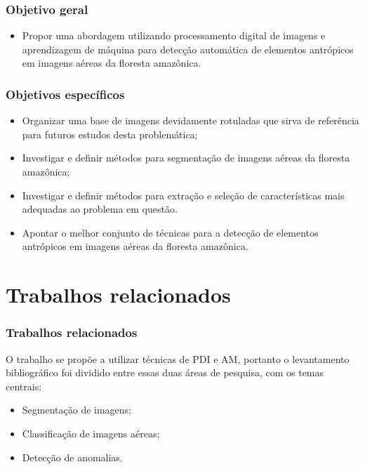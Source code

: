 \documentclass[t]{beamer}
\begin{document}
\begin{frame}[c]
\frametitle{Objetivo geral}

\begin{itemize}
	\item Propor uma abordagem utilizando processamento digital de imagens e aprendizagem de máquina para detecção automática de elementos antrópicos em imagens aéreas da floresta amazônica.
\end{itemize}
\end{frame}

\begin{frame}[c]
\frametitle{Objetivos específicos}

\begin{itemize}
    \item Organizar uma base de imagens devidamente rotuladas que sirva de referência para futuros estudos desta problemática;
    \item Investigar e definir métodos para segmentação de imagens aéreas da floresta amazônica;
    \item Investigar e definir métodos para extração e seleção de características mais adequadas ao problema em questão.
    \item Apontar o melhor conjunto de técnicas para a detecção de elementos antrópicos em imagens aéreas da floresta amazônica.
\end{itemize}

\end{frame}


\section{Trabalhos relacionados}

\begin{frame}[c]
	\frametitle{Trabalhos relacionados}

	O trabalho se propõe a utilizar técnicas de PDI e AM, portanto o levantamento bibliográfico foi dividido entre essas duas áreas de pesquisa, com os temas centrais:
	\vspace{0.5cm}
	\begin{itemize}
		\item Segmentação de imagens;
		\item Classificação de imagens aéreas;
		\item Detecção de anomalias.
	\end{itemize}
\end{frame}
\end{document}
